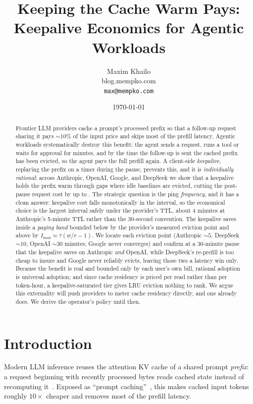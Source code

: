 \documentclass[10pt,twocolumn]{article}
\title{\vspace{-2em}Keeping the Cache Warm Pays:\\Keepalive Economics for Agentic Workloads}
\author{Maxim Khailo \\ \small blog.mempko.com \\ \small \texttt{max@mempko.com}}
\date{\today}
\begin{document}
\maketitle

\begin{abstract}
Frontier LLM providers cache a prompt's processed prefix so that a follow-up
request sharing it pays ${\sim}10\%$ of the input price and skips most of the
prefill latency. Agentic workloads systematically destroy this benefit: the
agent sends a request, runs a tool or waits for approval for minutes, and by
the time the follow-up is sent the cached prefix has been evicted, so the agent
pays the full prefill again. A client-side \emph{keepalive}, replaying the
prefix on a timer during the pause, prevents this, and it is \emph{individually
rational}: across Anthropic, OpenAI, Google, and DeepSeek we show that a
keepalive holds the prefix warm through gaps where idle baselines are evicted,
cutting the post-pause request cost by up to \bestSavingRatio{}. The strategic
question is the ping \emph{frequency}, and it has a clean answer: keepalive
cost falls monotonically in the interval, so the economical choice is the
largest interval safely under the provider's TTL, about 4 minutes at
Anthropic's 5-minute TTL rather than the 30-second convention. The keepalive
saves inside a \emph{paying band} bounded below by the provider's measured
eviction point and above by $I_{\max}\approx\tau(w/r-1)$. We locate each
eviction point (Anthropic ${\sim}5$, DeepSeek ${\sim}10$, OpenAI ${\sim}30$
minutes; Google never converges) and confirm at a 30-minute pause that the
keepalive saves on Anthropic \emph{and} OpenAI, while DeepSeek's re-prefill is
too cheap to insure and Google never reliably evicts, leaving those two a
latency win only. Because the benefit is real and bounded only by each user's own bill, rational
adoption is universal adoption; and since cache residency is priced per read
rather than per token-hour, a keepalive-saturated tier gives LRU eviction
nothing to rank. We argue this externality will push providers to meter cache
residency directly, and one already does. We derive the operator's policy until
then.
\end{abstract}

\section{Introduction}
Modern LLM inference reuses the attention KV cache of a shared prompt
\emph{prefix}: a request beginning with recently processed bytes reads cached
state instead of recomputing
it~\cite{pope2023efficiently,kwon2023efficient,gim2024promptcache}. Exposed as
``prompt caching''~\cite{anthropic-caching,openai-caching,google-caching}, this
makes cached input tokens roughly $10\times$ cheaper and removes most of the
prefill latency.
\end{document}
